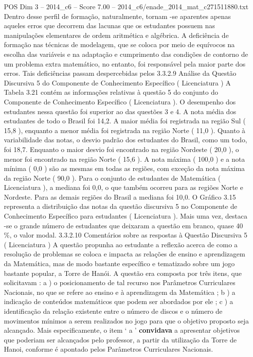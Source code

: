 \begin{textsample}{POS Dim 3 – 2014\_c6 – Score 7.00 – 2014\_c6/enade\_2014\_mat\_c271511880.txt}
Dentro desse perfil de formação, naturalmente, tornam -se aparentes apenas aqueles erros que decorrem das lacunas que os estudantes possuem nas manipulações elementares de ordem aritmética e algébrica.
A deficiência de formação nas técnicas de modelagem, que se coloca por meio de equívocos na escolha das variáveis e na adaptação e cumprimento das condições de contorno de um problema extra matemático, no entanto, foi responsável pela maior parte dos erros.
Tais deficiências passam despercebidas pelos 3.3.2.9 Análise da Questão Discursiva 5 do Componente de Conhecimento Específico ( Licenciatura ) A Tabela 3.21 contém as informações relativas à questão 5 do conjunto do Componente de Conhecimento Específico ( Licenciatura ).
O desempenho dos estudantes nessa questão foi superior ao das questões 3 e 4.
A nota média dos estudantes de todo o Brasil foi 14,2.
A maior média foi registrada na região Sul ( 15,8 ), enquanto a menor média foi registrada na região Norte ( 11,0 ).
Quanto à variabilidade das notas, o desvio padrão dos estudantes do Brasil, como um todo, foi 18,7.
Enquanto o maior desvio foi encontrado na região Nordeste ( 20,0 ), o menor foi encontrado na região Norte ( 15,6 ).
A nota máxima ( 100,0 ) e a nota mínima ( 0,0 ) são as mesmas em todas as regiões, com exceção da nota máxima da região Norte ( 90,0 ).
Para o conjunto de estudantes de Matemática ( Licenciatura ), a mediana foi 0,0, o que também ocorreu para as regiões Norte e Nordeste.
Para as demais regiões do Brasil a mediana foi 10,0.
O Gráfico 3.15 representa a distribuição das notas da questão discursiva 5 no Componente de Conhecimento Específico para estudantes ( Licenciatura ).
Mais uma vez, destaca -se o grande número de estudantes que deixaram a questão em branco, quase 40 \%, o valor modal. 3.3.2.10 Comentários sobre as respostas à Questão Discursiva 5 ( Licenciatura ) A questão propunha ao estudante a reflexão acerca de como a resolução de problemas se coloca e impacta as relações de ensino e aprendizagem da Matemática, mas de modo bastante específico e tematizado sobre um jogo bastante popular, a Torre de Hanói.
A questão era composta por três itens, que solicitavam : a ) o posicionamento de tal recurso nos Parâmetros Curriculares Nacionais, no que se refere ao ensino e à aprendizagem da Matemática ; b ) a indicação de conteúdos matemáticos que podem ser abordados por ele ; c ) a identificação da relação existente entre o número de discos e o número de movimentos mínimos a serem realizados no jogo para que o objetivo proposto seja alcançado.
Mais especificamente, o item ‘ a ’ \textbf{convidava} a apresentar objetivos que poderiam ser alcançados pelo professor, a partir da utilização da Torre de Hanoi, conforme é apontado pelos Parâmetros Curriculares Nacionais.

\end{textsample}
